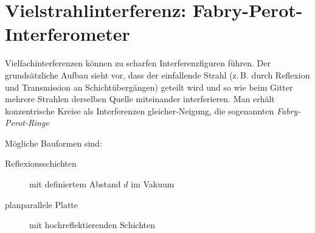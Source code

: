 
\section{Vielstrahlinterferenz: Fabry-Perot-Interferometer}
Vielfachinterferenzen können zu scharfen Interferenzfiguren führen.
Der grundsätzliche Aufbau sieht vor, dass der einfallende Strahl
(z.\,B. durch Reflexion und Transmission an Schichtübergängen)
geteilt wird und so wie beim Gitter mehrere Strahlen derselben Quelle
miteinander interferieren.
Man erhält konzentrische Kreise als Interferenzen gleicher-Neigung,
die sogenannten \emph{Fabry-Perot-Ringe}

Mögliche Bauformen sind:
\begin{description}
\item[Reflexionsschichten] mit definiertem Abstand $d$ im Vakuum
\item[planparallele Platte] mit hochreflektierenden Schichten
\end{description}

